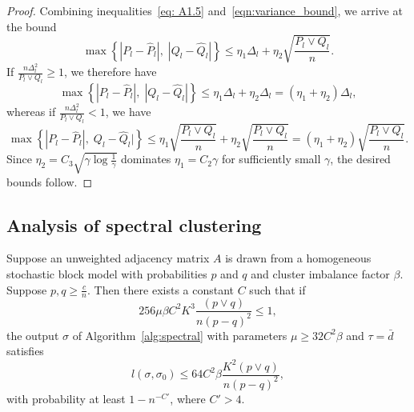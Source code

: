 \documentclass{article}
\begin{document}
\begin{proof}
Combining inequalities~\eqref{eq: A1.5} and~\eqref{eqn:variance_bound}, we arrive at the bound
\begin{equation}\label{eq: combine}
\max\left\{|P_l - \hat P_l|, \; |Q_l - \hat Q_l|\right\} \leq \eta_1 \Delta_l + \eta_2 \sqrt{\frac{P_l \vee Q_l}{n}}.
\end{equation}
If $\frac{n\Delta_l^2}{P_l \vee Q_l} \geq 1$, we therefore have
\begin{equation*}
\max\left\{|P_l - \hat P_l|, \; |Q_l - \hat Q_l|\right\} \leq \eta_1 \Delta_l + \eta_2 \Delta_l = (\eta_1 + \eta_2) \Delta_l,
\end{equation*}
whereas if $\frac{n\Delta_l^2}{P_l \vee Q_l} < 1$, we have
\begin{equation*}
\max\left\{|P_l - \hat P_l|, \; Q_l - \hat Q_l|\right\} \leq \eta_1\sqrt{\frac{P_l \vee Q_l}{n}}+ \eta_2 \sqrt{\frac{P_l \vee Q_l}{n}} = (\eta_1 + \eta_2)\sqrt{\frac{P_l \vee Q_l}{n}}. 
\end{equation*}
Since $\eta_2 = C_3 \sqrt{\gamma \log \frac{1}{\gamma}}$ dominates $\eta_1 = C_2 \gamma$ for sufficiently small $\gamma$, the desired bounds follow.
\end{proof}


\subsection{Analysis of spectral clustering}
\label{appendix: spectral}

\begin{proposition}
\label{prop:spectral_analysis}
Suppose an unweighted adjacency matrix $A$ is drawn from a homogeneous stochastic block model with probabilities $p$ and $q$ and cluster imbalance factor $\beta$. Suppose $p, q \geq \frac{c}{n}$. Then there exists a constant $C$ such that if
$$256 \mu \beta C^2 K^3 \frac{(p \vee q)}{n (p-q)^2} \leq 1,$$
the output $\sigma$ of Algorithm~\ref{alg:spectral} with parameters $\mu \geq 32 C^2 \beta$ and $\tau = \bar{d}$ satisfies
\[
l(\sigma, \sigma_0) \leq 64 C^2 \beta  \frac{K^2 (p \vee q) }{n (p-q)^2},
\]
with probability at least $1 - n^{-C'}$, where $C' > 4$.
\end{proposition}
\end{document}
